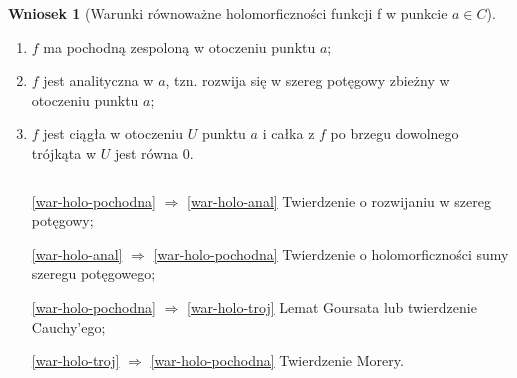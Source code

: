 \documentclass[11pt]{article}
\theoremstyle{plain}
\theoremstyle{definition}
\newtheorem*{corollary}{Wniosek}
\theoremstyle{remark}
\let\oldendproof\endproof
\renewenvironment{proof}[1][\proofname]{
  \oldproof[\textsc{\small #1}]
}{\oldendproof}
\begin{document}
\begin{corollary}[Warunki równoważne holomorficzności funkcji f w punkcie $ a \in C $]
  $ $
  \begin{enumerate}
    \item $ f $ ma pochodną zespoloną w otoczeniu punktu $ a $; \label{war-holo-pochodna}
    \item $ f $ jest analityczna w $ a $, tzn. rozwija się w szereg potęgowy zbieżny w otoczeniu punktu $ a $; \label{war-holo-anal}
    \item $ f $ jest ciągła w otoczeniu $ U $ punktu $ a $ i całka z $ f $ po brzegu dowolnego trójkąta w $ U $ jest równa $ 0 $. \label{war-holo-troj}
  \end{enumerate}
\end{corollary}

\begin{proof}
  $ $
  \begin{enumerate}[leftmargin=5.1em]
    \item[\ref{war-holo-pochodna} $ \Rightarrow $ \ref{war-holo-anal}]%
    Twierdzenie o rozwijaniu w szereg potęgowy;

    \item[\ref{war-holo-anal} $ \Rightarrow $ \ref{war-holo-pochodna}]
    Twierdzenie o holomorficzności sumy szeregu potęgowego;

    \item[\ref{war-holo-pochodna} $ \Rightarrow $ \ref{war-holo-troj}]
    Lemat Goursata lub twierdzenie Cauchy’ego;

    \item[\ref{war-holo-troj} $ \Rightarrow $ \ref{war-holo-pochodna}]
    Twierdzenie Morery.
  \end{enumerate}
\end{proof}
\end{document}
